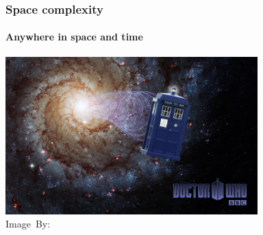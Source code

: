 

\begin{frame}
	\frametitle{Space complexity}
	\framesubtitle{Anywhere in space and time}
	\begin{center}
		\includegraphics[width=0.73\textwidth]{images/tardis.jpg}\\
		\hspace*{15pt}\hbox{\scriptsize Image By:}
	\end{center}
\end{frame}

